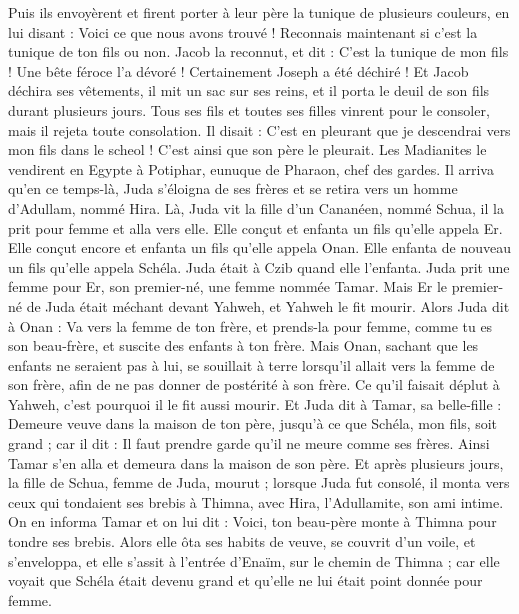 \begin{multicols}{2}
Puis ils envoyèrent et firent porter à leur père la tunique de plusieurs couleurs, en lui disant : Voici ce que nous avons trouvé ! Reconnais maintenant si c'est la tunique de ton fils ou non.
Jacob la reconnut, et dit : C'est la tunique de mon fils ! Une bête féroce l'a dévoré ! Certainement Joseph a été déchiré !
Et Jacob déchira ses vêtements, il mit un sac sur ses reins, et il porta le deuil de son fils durant plusieurs jours.
Tous ses fils et toutes ses filles vinrent pour le consoler, mais il rejeta toute consolation. Il disait : C’est en pleurant que je descendrai vers mon fils dans le scheol ! C'est ainsi que son père le pleurait.
Les Madianites le vendirent en Egypte à Potiphar, eunuque de Pharaon, chef des gardes.
\VerseOne{}Il arriva qu’en ce temps-là, Juda s’éloigna de ses frères et se retira vers un homme d’Adullam, nommé Hira.
Là, Juda vit la fille d'un Cananéen, nommé Schua, il la prit pour femme et alla vers elle.
Elle conçut et enfanta un fils qu’elle appela Er.
Elle conçut encore et enfanta un fils qu’elle appela Onan.
Elle enfanta de nouveau un fils qu’elle appela Schéla. Juda était à Czib quand elle l’enfanta.
Juda prit une femme pour Er, son premier-né, une femme nommée Tamar.
Mais Er le premier-né de Juda était méchant devant Yahweh, et Yahweh le fit mourir.
Alors Juda dit à Onan : Va vers la femme de ton frère, et prends-la pour femme, comme tu es son beau-frère, et suscite des enfants à ton frère.
Mais Onan, sachant que les enfants ne seraient pas à lui, se souillait à terre lorsqu’il allait vers la femme de son frère, afin de ne pas donner de postérité à son frère.
Ce qu'il faisait déplut à Yahweh, c'est pourquoi il le fit aussi mourir.
Et Juda dit à Tamar, sa belle-fille : Demeure veuve dans la maison de ton père, jusqu'à ce que Schéla, mon fils, soit grand ; car il dit : Il faut prendre garde qu'il ne meure comme ses frères. Ainsi Tamar s'en alla et demeura dans la maison de son père.
Et après plusieurs jours, la fille de Schua, femme de Juda, mourut ; lorsque Juda fut consolé, il monta vers ceux qui tondaient ses brebis à Thimna, avec Hira, l’Adullamite, son ami intime.
On en informa Tamar et on lui dit : Voici, ton beau-père monte à Thimna pour tondre ses brebis.
Alors elle ôta ses habits de veuve, se couvrit d'un voile, et s'enveloppa, et elle s’assit à l’entrée d’Enaïm, sur le chemin de Thimna ; car elle voyait que Schéla était devenu grand et qu’elle ne lui était point donnée pour femme.

\end{multicols}
